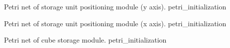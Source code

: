 

{Petri net of storage unit positioning module (y axis).}
{petri_initialization}



{Petri net of storage unit positioning module (x axis).}
{petri_initialization}



{Petri net of cube storage module.}
{petri_initialization}








